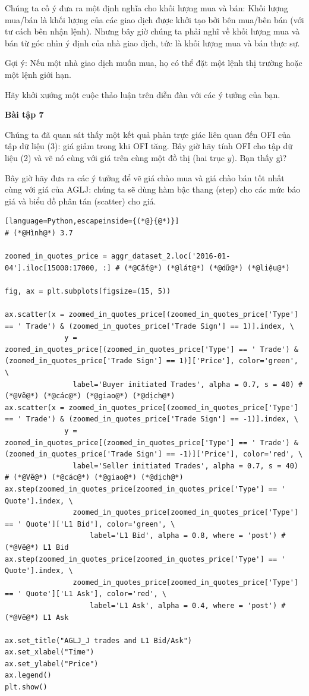 Chúng ta cố ý đưa ra một định nghĩa cho khối lượng mua và bán: Khối lượng mua/bán là khối lượng của các giao dịch được khởi tạo bởi bên mua/bên bán (với tư cách bên nhận lệnh). Nhưng bây giờ chúng ta phải nghĩ về khối lượng mua và bán từ góc nhìn ý định của nhà giao dịch, tức là khối lượng mua và bán thực sự.

Gợi ý: Nếu một nhà giao dịch muốn mua, họ có thể đặt một lệnh thị trường hoặc một lệnh giới hạn.

Hãy khởi xướng một cuộc thảo luận trên diễn đàn với các ý tưởng của bạn.

\textbf{Bài tập 7}

Chúng ta đã quan sát thấy một kết quả phản trực giác liên quan đến OFI của tập dữ liệu (3): giá giảm trong khi OFI tăng. Bây giờ hãy tính OFI cho tập dữ liệu (2) và vẽ nó cùng với giá trên cùng một đồ thị (hai trục $y$). Bạn thấy gì?

Bây giờ hãy đưa ra các ý tưởng để vẽ giá chào mua và giá chào bán tốt nhất cùng với giá của AGLJ: chúng ta sẽ dùng hàm bậc thang (step) cho các mức báo giá và biểu đồ phân tán (scatter) cho giá.

\begin{lstlisting}[language=Python,escapeinside={(*@}{@*)}]
# (*@Hình@*) 3.7

zoomed_in_quotes_price = aggr_dataset_2.loc['2016-01-04'].iloc[15000:17000, :] # (*@Cắt@*) (*@lát@*) (*@dữ@*) (*@liệu@*)

fig, ax = plt.subplots(figsize=(15, 5))

ax.scatter(x = zoomed_in_quotes_price[(zoomed_in_quotes_price['Type'] == ' Trade') & (zoomed_in_quotes_price['Trade Sign'] == 1)].index, \
              y = zoomed_in_quotes_price[(zoomed_in_quotes_price['Type'] == ' Trade') & (zoomed_in_quotes_price['Trade Sign'] == 1)]['Price'], color='green', \
                label='Buyer initiated Trades', alpha = 0.7, s = 40) # (*@Vẽ@*) (*@các@*) (*@giao@*) (*@dịch@*)
ax.scatter(x = zoomed_in_quotes_price[(zoomed_in_quotes_price['Type'] == ' Trade') & (zoomed_in_quotes_price['Trade Sign'] == -1)].index, \
              y = zoomed_in_quotes_price[(zoomed_in_quotes_price['Type'] == ' Trade') & (zoomed_in_quotes_price['Trade Sign'] == -1)]['Price'], color='red', \
                label='Seller initiated Trades', alpha = 0.7, s = 40) # (*@Vẽ@*) (*@các@*) (*@giao@*) (*@dịch@*)
ax.step(zoomed_in_quotes_price[zoomed_in_quotes_price['Type'] == ' Quote'].index, \
                zoomed_in_quotes_price[zoomed_in_quotes_price['Type'] == ' Quote']['L1 Bid'], color='green', \
                    label='L1 Bid', alpha = 0.8, where = 'post') # (*@Vẽ@*) L1 Bid
ax.step(zoomed_in_quotes_price[zoomed_in_quotes_price['Type'] == ' Quote'].index, \
                zoomed_in_quotes_price[zoomed_in_quotes_price['Type'] == ' Quote']['L1 Ask'], color='red', \
                    label='L1 Ask', alpha = 0.4, where = 'post') # (*@Vẽ@*) L1 Ask

ax.set_title("AGLJ_J trades and L1 Bid/Ask")
ax.set_xlabel("Time")
ax.set_ylabel("Price")
ax.legend()
plt.show()
\end{lstlisting}

